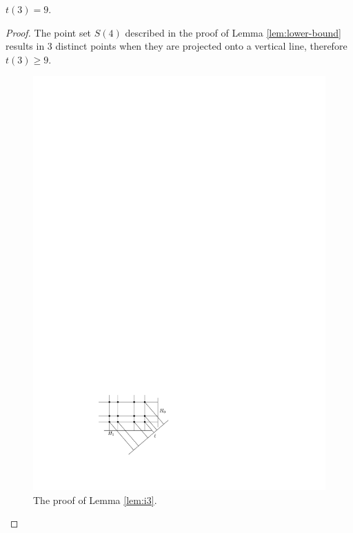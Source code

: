 \documentclass{ws-ijcga}
\begin{document}
\begin{lemma}\label{lem:i3}
$t(3)=9$.
\end{lemma}

\begin{proof}
The point set $S(4)$ described in the proof of Lemma \ref{lem:lower-bound}
results in 3 distinct points when they are projected onto a vertical line, therefore
$t(3)\ge 9$.

\begin{figure}[b]
  \begin{center}
    \includegraphics{3opt}
  \end{center}
  \caption{The proof of Lemma \ref{lem:i3}.}
  \label{fig:3opt}
\end{figure}


\end{proof}
\end{document}
